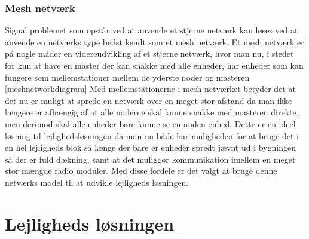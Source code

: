 \subsubsection*{Mesh netværk}
Signal problemet som opstår ved at anvende et stjerne netværk kan løses ved at anvende en netværks type bedst kendt som et mesh netværk.
Et mesh netværk er på nogle måder en videreudvikling af et stjerne netværk, hvor man nu, i stedet for kun at have en master der kan snakke med alle enheder, har enheder som kan fungere som mellemstationer mellem de yderste noder og masteren \ref{meshnetworkdiagram}
Med mellemstationerne i mesh netværket betyder det at det nu er muligt at sprede en netværk over en meget stor afstand da man ikke længere er afhængig af at alle noderne skal kunne snakke med masteren direkte, men derimod skal alle enheder bare kunne se en anden enhed. Dette er en ideel løsning til lejlighedsløsningen da man nu både har muligheden for at bruge det i en hel lejligheds blok så længe der bare er enheder spredt jævnt ud i bygningen så der er fuld dækning, samt at det muliggør kommunikation imellem en meget stor mængde radio moduler. Med disse fordele er det valgt at bruge denne netværks model til at udvikle lejligheds løsningen.

\section{Lejligheds løsningen}

